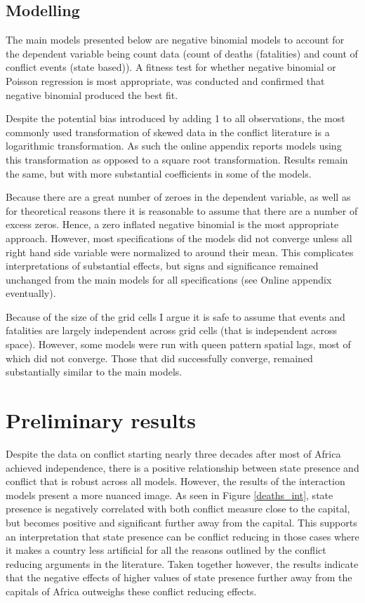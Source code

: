 \documentclass[12pt]{article}
\begin{document}
\subsection{Modelling}

The main models presented below are negative binomial models to account for the
dependent variable being count data (count of deaths (fatalities) and count of
conflict events (state based)). A fitness test for whether negative binomial or
Poisson regression is most appropriate, was conducted and confirmed that
negative binomial produced the best fit.

Despite the potential bias introduced by adding 1 to all observations, the most
commonly used transformation of skewed data in the conflict literature is a
logarithmic transformation. As such the online appendix reports models using
this transformation as opposed to a square root transformation. Results remain
the same, but with more substantial coefficients in some of the models.

Because there are a great number of zeroes in the dependent variable, as well
as for theoretical reasons there it is reasonable to assume that there are a
number of excess zeros. Hence, a zero inflated negative binomial is the most
appropriate approach. However, most specifications of the models did not
converge unless all right hand side variable were normalized to around their
mean. This complicates interpretations of substantial effects, but signs and
significance remained unchanged from the main models for all specifications (see
Online appendix eventually).

Because of the size of the grid cells I argue it is safe to assume that events
and fatalities are largely independent across grid cells (that is independent
across space). However, some models were run with queen pattern spatial lags,
most of which did not converge. Those that did successfully converge, remained
substantially similar to the main models.

\section{Preliminary results}

Despite the data on conflict starting nearly three decades after most of Africa
achieved independence, there is a positive relationship between state presence
and conflict that is robust across all models. However, the results of the interaction
models present a more nuanced image. As seen in Figure \ref{deaths_int},
state presence is negatively correlated with both conflict measure close to the
capital, but becomes positive and significant further away from the capital.
This supports an interpretation that state presence can be conflict reducing in
those cases where it makes a country less artificial for all the reasons
outlined by the conflict reducing arguments in the literature. Taken together
however, the results indicate that the negative effects of higher values of
state presence further away from the capitals of Africa outweighs these conflict
reducing effects. 
\end{document}
